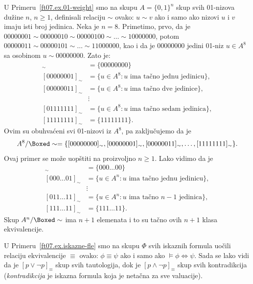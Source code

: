 \begin{EX}
  U Primeru~\ref{ft07.ex.01-weight} smo na skupu $A = \{0,1\}^n$ skup svih 01-nizova du\v zine $n$, $n \ge 1$,
  definisali relaciju $\sim$ ovako: $u \sim v$ ako i samo ako nizovi $u$ i $v$ imaju isti broj jedinica.
  Neka je $n = 8$. Primetimo, prvo, da je $00000001 \sim 00000010 \sim 00000100 \sim \ldots \sim 10000000$,
  potom $00000011 \sim 00000101 \sim \ldots \sim 11000000$, kao i da je $00000000$ jedini 01-niz $u \in A^8$
  sa osobinom $u \sim 00000000$. Zato je:
  \begin{align*}
    [00000000]_\sim &= \{00000000\}\\
    [00000001]_\sim &= \{ u \in A^8 : u \text{ ima ta\v cno jednu jedinicu} \},\\
    [00000011]_\sim &= \{ u \in A^8 : u \text{ ima ta\v cno dve jedinice} \},\\
                    &\vdots\\
    [01111111]_\sim &= \{ u \in A^8 : u \text{ ima ta\v cno sedam jedinica} \},\\
    [11111111]_\sim &= \{ 11111111 \}.
  \end{align*}
  Ovim su obuhva\'ceni svi 01-nizovi iz $A^8$, pa zaklju\v cujemo da je
  $$
    A^8 / \Boxed\sim = \{[00000000]_\sim, [00000001]_\sim, [00000011]_\sim, \ldots, [11111111]_\sim\}.
  $$
  Ovaj primer se mo\v ze uop\v stiti na proizvoljno $n \ge 1$. Lako vidimo da je
  \begin{align*}
    [000\ldots00]_\sim &= \{000\ldots00\}\\
    [000\ldots01]_\sim &= \{ u \in A^n : u \text{ ima ta\v cno jednu jedinicu} \},\\
                    &\vdots\\
    [011\ldots11]_\sim &= \{ u \in A^n : u \text{ ima ta\v cno $n-1$ jedinica} \},\\
    [111\ldots11]_\sim &= \{ 111\ldots11 \}.
  \end{align*}
  Skup $A^n / \Boxed\sim$ ima $n + 1$ elemenata i to su ta\v cno ovih $n + 1$ klasa ekvivalencije.
\end{EX}

\begin{EX}
  U Primeru~\ref{ft07.ex.iskazne-fle} smo na skupu $\Phi$ svih iskaznih formula uo\v cili relaciju
  ekvivalencije $\equiv$ ovako: $\phi \equiv \psi$ ako i samo ako $\vDash \phi \Leftrightarrow \psi$.
  Sada se lako vidi da je \hbox{$[p \lor \lnot p]_\equiv$} skup svih tautologija, dok je
  \hbox{$[p \land \lnot p]_\equiv$} skup svih kontradikcija (\emph{kontradikcija} je iskazna formula koja je neta\v cna
  za sve valuacije).
\end{EX}

